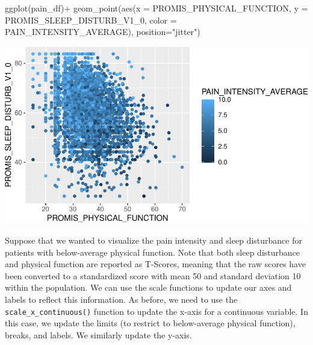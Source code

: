 \documentclass[
  letterpaper,
]{latex/krantz}
\makeatletter
\newenvironment{Shaded}{\begin{snugshade}}{\end{snugshade}}
\newcommand{\AttributeTok}[1]{\textcolor[rgb]{0.40,0.45,0.13}{#1}}
\newcommand{\FunctionTok}[1]{\textcolor[rgb]{0.28,0.35,0.67}{#1}}
\newcommand{\NormalTok}[1]{\textcolor[rgb]{0.00,0.23,0.31}{#1}}
\newcommand{\SpecialCharTok}[1]{\textcolor[rgb]{0.37,0.37,0.37}{#1}}
\newcommand{\StringTok}[1]{\textcolor[rgb]{0.13,0.47,0.30}{#1}}
\newenvironment{kframe}{%
\medskip{}
\setlength{\fboxsep}{.8em}
 \def\at@end@of@kframe{}%
 \ifinner\ifhmode%
  \def\at@end@of@kframe{\end{minipage}}%
  \begin{minipage}{\columnwidth}%
 \fi\fi%
 \def\FrameCommand##1{\hskip\@totalleftmargin \hskip-\fboxsep
 \colorbox{shadecolor}{##1}\hskip-\fboxsep
     \hskip-\linewidth \hskip-\@totalleftmargin \hskip\columnwidth}%
 \MakeFramed {\advance\hsize-\width
   \@totalleftmargin\z@ \linewidth\hsize
   \@setminipage}}%
 {\par\unskip\endMakeFramed%
 \at@end@of@kframe}
\renewenvironment{Shaded}{\begin{kframe}}{\end{kframe}}
\makeatother
\begin{document}
\begin{Shaded}
\begin{Highlighting}[]
\FunctionTok{ggplot}\NormalTok{(pain\_df)}\SpecialCharTok{+}
  \FunctionTok{geom\_point}\NormalTok{(}\FunctionTok{aes}\NormalTok{(}\AttributeTok{x =}\NormalTok{ PROMIS\_PHYSICAL\_FUNCTION, }
                 \AttributeTok{y =}\NormalTok{ PROMIS\_SLEEP\_DISTURB\_V1\_0, }
                 \AttributeTok{color =}\NormalTok{ PAIN\_INTENSITY\_AVERAGE), }\AttributeTok{position=}\StringTok{"jitter"}\NormalTok{)}
\end{Highlighting}
\end{Shaded}

\begin{center}
\includegraphics[width=1\textwidth,height=\textheight]{book/visualization_ggplot_files/figure-pdf/unnamed-chunk-9-1.pdf}
\end{center}

Suppose that we wanted to visualize the pain intensity and sleep
disturbance for patients with below-average physical function. Note that
both sleep disturbance and physical function are reported as T-Scores,
meaning that the raw scores have been converted to a standardized score
with mean 50 and standard deviation 10 within the population. We can use
the scale functions to update our axes and labels to reflect this
information. As before, we need to use the
\texttt{scale\_x\_continuous()} function to update the x-axis for a
continuous variable. In this case, we update the limits (to restrict to
below-average physical function), breaks, and labels. We similarly
update the y-axis.
\end{document}
